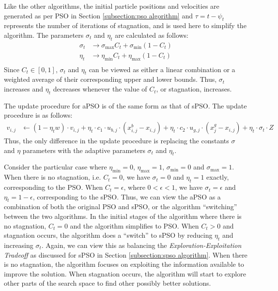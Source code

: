 \documentclass[12pt]{article}
\theoremstyle{definition}
\begin{document}
Like the other algorithms, the initial particle positions and velocities are generated as per PSO in Section \ref{subsection:pso algorithm} and $\tau = t - \psi_t$ represents the number of iterations of stagnation, and is used here to simplify the algorithm. The parameters $\sigma_t$ and $\eta_t$ are calculated as follows:
$$\begin{aligned}
\sigma_t &\rightarrow \sigma_\text{max} C_t + \sigma_\text{min} (1 - C_t) \\
\eta_t &\rightarrow \eta_\text{min} C_t + \eta_\text{max} (1 - C_t) \\
\end{aligned}$$
Since $C_t \in [0, 1]$, $\sigma_t$ and $\eta_t$ can be viewed as either a linear combination or a weighted average of their corresponding upper and lower bounds. Thus, $\sigma_t$ increases and $\eta_t$ decreases whenever the value of $C_t$, or stagnation, increases. \newline

The update procedure for aPSO is of the same form as that of sPSO. The update procedure is as follows:
$$\begin{aligned}
v_{i,j} &\leftarrow (1 - \eta_t w) \cdot v_{i,j} + \eta_t \cdot c_1 \cdot u_{b,j} \cdot  (x^b_{i,j} - x_{i,j}) + \eta_t \cdot c_2 \cdot u_{g,j} \cdot (x^g_j - x_{i,j}) + \eta_t \cdot \sigma_t \cdot Z
\end{aligned}$$
Thus, the only difference in the update procedure is replacing the constants $\sigma$ and $\eta$ parameters with the adaptive parameters $\sigma_t$ and $\eta_t$. \newline

Consider the particular case where $\eta_\text{min} = 0$, $\eta_\text{max} = 1$, $\sigma_\text{min} = 0$ and $\sigma_\text{max} = 1$. When there is no stagnation, i.e. $C_t = 0$, we have $\sigma_t = 0$ and $\eta_t = 1$ exactly, corresponding to the PSO. When $C_t = \epsilon$, where $0 < \epsilon < 1$, we have $\sigma_t = \epsilon$ and $\eta_t = 1 - \epsilon$, corresponding to the sPSO. Thus, we can view the aPSO as a combination of both the original PSO and sPSO, or the algorithm ``switching'' between the two algorithms. In the initial stages of the algorithm where there is no stagnation, $C_t = 0$ and the algorithm simplifies to PSO. When $C_t > 0$ and stagnation occurs, the algorithm does a ``switch'' to sPSO by reducing $\eta_t$ and increasing $\sigma_t$. Again, we can view this as balancing the \textit{Exploration-Exploitation Tradeoff} as discussed for sPSO in Section \ref{subsection:spso algorithm}. When there is no stagnation, the algorithm focuses on exploiting the information available to improve the solution. When stagnation occurs, the algorithm will start to explore other parts of the search space to find other possibly better solutions.
\end{document}
